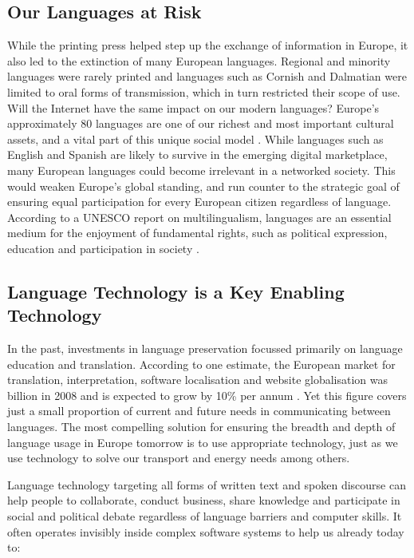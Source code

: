 \begin{multicols}{2}
\subsection{Our Languages at Risk}

While the printing press helped step up the exchange of information in Europe, it also led to the extinction of many European languages. Regional and minority languages were rarely printed and languages such as Cornish and Dalmatian were limited to oral forms of transmission, which in turn restricted their scope of use. Will the Internet have the same impact on our modern languages?
Europe's approximately 80 languages are one of our richest and most important cultural assets, and a vital part of this unique social model \cite{EC2}. While languages such as English and Spanish are likely to survive in the emerging digital marketplace, many European languages could become irrelevant in a networked society. This would weaken Europe's global standing, and run counter to the strategic goal of ensuring equal participation for every European citizen regardless of language. According to a UNESCO report on multilingualism, languages are an essential medium for the enjoyment of fundamental rights, such as political expression, education and participation in society \cite{Unesco1}.

\subsection{Language Technology is a Key Enabling Technology}

In the past, investments in language preservation focussed primarily on language education and translation. According to one estimate, the European market for translation, interpretation, software localisation and website globalisation was  billion in 2008 and is expected to grow by 10\% per annum \cite{EC3}. Yet this figure covers just a small proportion of current and future needs in communicating between languages. The most compelling solution for ensuring the breadth and depth of language usage in Europe tomorrow is to use appropriate technology, just as we use technology to solve our transport and energy needs among others.


Language technology targeting all forms of written text and spoken discourse can help people to collaborate, conduct business, share knowledge and participate in social and political debate regardless of language barriers and computer skills. It often operates invisibly inside complex software systems to help us already today to:


\end{multicols}
